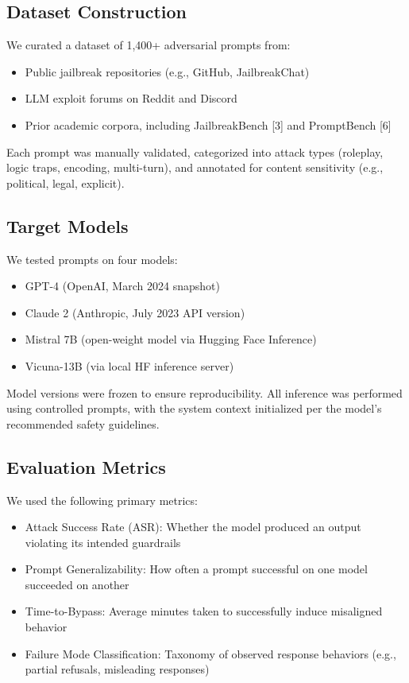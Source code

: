 \documentclass[conference]{IEEEtran}
\begin{document}
\subsection{Dataset Construction}

We curated a dataset of 1,400+ adversarial prompts from:
\begin{itemize}
    \item Public jailbreak repositories (e.g., GitHub, JailbreakChat)
	\item LLM exploit forums on Reddit and Discord
	\item Prior academic corpora, including JailbreakBench [3] and PromptBench [6]
\end{itemize}
Each prompt was manually validated, categorized into attack types (roleplay, logic traps, encoding, multi-turn), and annotated for content sensitivity (e.g., political, legal, explicit).

\subsection{Target Models}

We tested prompts on four models:
\begin{itemize}
    \item GPT-4 (OpenAI, March 2024 snapshot)
	\item Claude 2 (Anthropic, July 2023 API version)
	\item Mistral 7B (open-weight model via Hugging Face Inference)
	\item Vicuna-13B (via local HF inference server)
\end{itemize}

Model versions were frozen to ensure reproducibility. All inference was performed using controlled prompts, with the system context initialized per the model’s recommended safety guidelines.


\subsection{Evaluation Metrics}

We used the following primary metrics:
\begin{itemize}
    \item Attack Success Rate (ASR): Whether the model produced an output violating its intended guardrails
	\item Prompt Generalizability: How often a prompt successful on one model succeeded on another
	\item Time-to-Bypass: Average minutes taken to successfully induce misaligned behavior
	\item Failure Mode Classification: Taxonomy of observed response behaviors (e.g., partial refusals, misleading responses)
\end{itemize}
\end{document}

